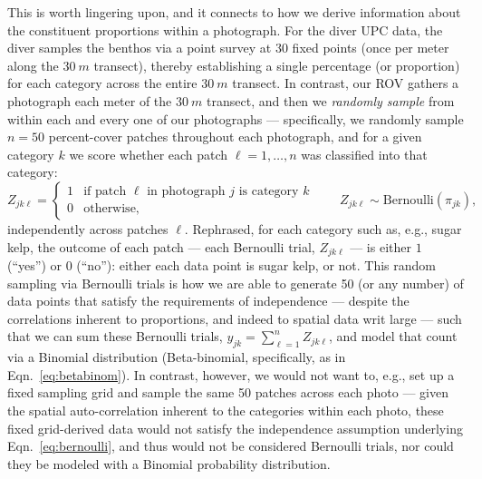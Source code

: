 \documentclass[11pt]{article}
\begin{document}
This is worth lingering upon, and it connects to how we derive information 
about the constituent proportions within a photograph. 
For the diver UPC data, the diver samples the benthos via a 
point survey at 30 fixed points (once per meter along the $30~m$ 
transect), thereby establishing a single percentage (or proportion) for each 
category across the entire $30~m$ transect. 
In contrast, our ROV gathers a photograph each meter of the $30~m$ transect,
and then we \textit{randomly sample} from within each and every one of our
photographs --- specifically, we randomly sample $n=50$ percent-cover patches
throughout each photograph, and for a given category $k$ we score whether
each patch $\ell = 1, \dots, n$ was classified into that category:
\begin{equation}
Z_{jk\ell} =
\begin{cases}
1 & \text{if patch } \ell \text{ in photograph } j \text{ is category } k \\
0 & \text{otherwise,}
\end{cases}
\qquad
Z_{jk\ell} \sim \mathrm{Bernoulli}(\pi_{jk}),
\label{eq:bernoulli}
\end{equation}
independently across patches $\ell$.
Rephrased, for each category such as, e.g., sugar kelp, the outcome of each
patch --- each Bernoulli trial, $Z_{jk\ell}$ --- is either $1$ (``yes'') or $0$
(``no''): either each data point is sugar kelp, or not.
This random sampling via Bernoulli trials is how we are able to generate 50
(or any number) of data points that satisfy the requirements of independence
--- despite the correlations inherent to proportions, and indeed to spatial
data writ large --- such that we can sum these Bernoulli trials,
$y_{jk} = \sum_{\ell=1}^{n} Z_{jk\ell}$, and model that count via a Binomial
distribution (Beta-binomial, specifically, as in Eqn.~\ref{eq:betabinom}).
In contrast, however, we would not want to, e.g., set up a fixed sampling grid
and sample the same 50 patches across each photo --- given the spatial
auto-correlation inherent to the categories within each photo, these fixed
grid-derived data would not satisfy the independence assumption underlying
Eqn.~\ref{eq:bernoulli}, and thus would not be considered Bernoulli trials,
nor could they be modeled with a Binomial probability distribution.
\end{document}
